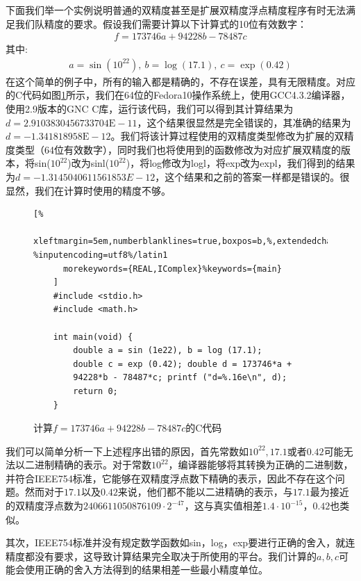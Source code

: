 下面我们举一个实例说明普通的双精度甚至是扩展双精度浮点精度程序有时无法满足我们队精度的要求。假设我们需要计算以下计算式的10位有效数字：
\begin{align*}
    f = 173746a + 94228b - 78487c
\end{align*}
其中:
\begin{align*} 
    a = \sin(10^{22}),\ b = \log(17.1),\ c = \exp(0.42)
\end{align*}
在这个简单的例子中，所有的输入都是精确的，不存在误差，具有无限精度。对应的C代码如图\ref{lst:arbiexcode}所示，我们在64位的Fedora10操作系统上，使用GCC4.3.2编译器，使用2.9版本的GNC C库，运行该代码，我们可以得到其计算结果为$d = 2.9103830456733704\text{E}-11$，这个结果很显然是完全错误的，其准确的结果为$d = −1.341818958\text{E}−12$。我们将该计算过程使用的双精度类型修改为扩展的双精度类型（64位有效数字），同时我们也将使用到的函数修改为对应扩展双精度的版本，将sin($10^{22}$)改为sinl($10^{22}$)，将log修改为logl，将exp改为expl，我们得到的结果为$d=-1.3145040611561853E−12$，这个结果和之前的答案一样都是错误的。很显然，我们在计算时使用的精度不够。

\begin{figure}[thbp]
    \begin{lstlisting}[%
      xleftmargin=5em,numberblanklines=true,boxpos=b,%,extendedchars=\true, %inputencoding=utf8%/latin1
      morekeywords={REAL,IComplex}%keywords={main}
    ]
    #include <stdio.h>
    #include <math.h>

    int main(void) {
        double a = sin (1e22), b = log (17.1);
        double c = exp (0.42); double d = 173746*a +
        94228*b - 78487*c; printf ("d=%.16e\n", d); 
        return 0;
    }

    \end{lstlisting}
    \caption{计算$f = 173746a + 94228b - 78487c$的C代码}
    \label{lst:arbiexcode}
\end{figure}

我们可以简单分析一下上述程序出错的原因，首先常数如$10^{22},17.1$或者$0.42$可能无法以二进制精确的表示。对于常数$10^{22}$，编译器能够将其转换为正确的二进制数，并符合IEEE754标准，它能够在双精度浮点数下精确的表示，因此不存在这个问题。然而对于$17.1$以及$0.42$来说，他们都不能以二进精确的表示，与$17.1$最为接近的双精度浮点数为$2406611050876109\cdot2^{−47}$，这与真实值相差$1.4\cdot10^{-15}$，$0.42$也类似。

其次，IEEE754标准并没有规定数学函数如sin，log，exp要进行正确的舍入，就连精度都没有要求，这导致计算结果完全取决于所使用的平台。我们计算的$a,b,c$可能会使用正确的舍入方法得到的结果相差一些最小精度单位。


